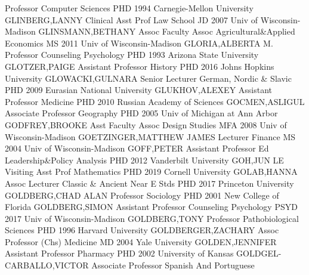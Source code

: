 \documentclass[
]{article}
\begin{document}
\textbar Professor \textbar Computer Sciences \textbar{} 
\textbar PHD 1994 Carnegie-Mellon University \textbar GLINBERG,LANNY
\textbar Clinical Asst Prof \textbar Law School \textbar{} 
\textbar JD 2007 Univ of Wisconsin-Madison \textbar GLINSMANN,BETHANY
\textbar Assoc Faculty Assoc \textbar Agricultural\&Applied Economics
\textbar{}  \textbar MS 2011 Univ of Wisconsin-Madison
\textbar GLORIA,ALBERTA M. \textbar Professor \textbar Counseling
Psychology \textbar{}  \textbar PHD 1993 Arizona State
University \textbar GLOTZER,PAIGE \textbar Assistant Professor
\textbar History \textbar{}  \textbar PHD 2016 Johns Hopkins
University \textbar GLOWACKI,GULNARA \textbar Senior Lecturer
\textbar German, Nordic \& Slavic \textbar{}  \textbar PHD
2009 Eurasian National University \textbar GLUKHOV,ALEXEY
\textbar Assistant Professor \textbar Medicine \textbar{} 
\textbar PHD 2010 Russian Academy of Sciences \textbar GOCMEN,ASLIGUL
\textbar Associate Professor \textbar Geography \textbar{} 
\textbar PHD 2005 Univ of Michigan at Ann Arbor \textbar GODFREY,BROOKE
\textbar Asst Faculty Assoc \textbar Design Studies \textbar{}
 \textbar MFA 2008 Univ of Wisconsin-Madison
\textbar GOETZINGER,MATTHEW JAMES \textbar Lecturer \textbar Finance
\textbar{}  \textbar MS 2004 Univ of Wisconsin-Madison
\textbar GOFF,PETER \textbar Assistant Professor \textbar Ed
Leadership\&Policy Analysis \textbar{}  \textbar PHD 2012
Vanderbilt University \textbar GOH,JUN LE \textbar Visiting Asst Prof
\textbar Mathematics \textbar{}  \textbar PHD 2019 Cornell
University \textbar GOLAB,HANNA \textbar Assoc Lecturer \textbar Classic
\& Ancient Near E Stds \textbar{}  \textbar PHD 2017
Princeton University \textbar GOLDBERG,CHAD ALAN \textbar Professor
\textbar Sociology \textbar{}  \textbar PHD 2001 New College
of Florida \textbar GOLDBERG,SIMON \textbar Assistant Professor
\textbar Counseling Psychology \textbar{}  \textbar PSYD
2017 Univ of Wisconsin-Madison \textbar GOLDBERG,TONY \textbar Professor
\textbar Pathobiological Sciences \textbar{}  \textbar PHD
1996 Harvard University \textbar GOLDBERGER,ZACHARY \textbar Assoc
Professor (Chs) \textbar Medicine \textbar{}  \textbar MD
2004 Yale University \textbar GOLDEN,JENNIFER \textbar Assistant
Professor \textbar Pharmacy \textbar{}  \textbar PHD 2002
University of Kansas \textbar GOLDGEL-CARBALLO,VICTOR \textbar Associate
Professor \textbar Spanish And Portuguese \textbar{} 
\end{document}

